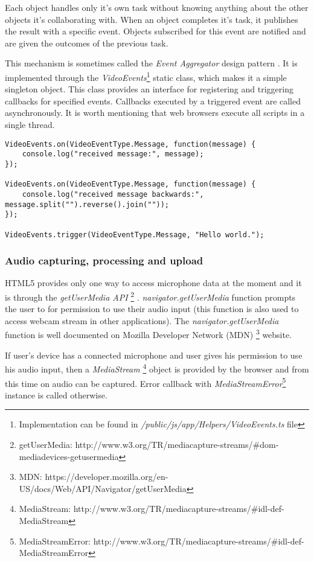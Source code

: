 Each object handles only it's own task without knowing anything about the other objects it's collaborating with. When an object completes it's task, it publishes the result with a specific event. Objects subscribed for this event are notified and are given the outcomes of the previous task.

This mechanism is sometimes called the \textit{Event Aggregator} design pattern \cite{}. It is implemented through the \textit{VideoEvents}\footnote{Implementation can be found in \textit{/public/js/app/Helpers/VideoEvents.ts} file} static class, which makes it a simple singleton object. This class provides an interface for registering and triggering callbacks for specified events. Callbacks executed by a triggered event are called asynchronously. It is worth mentioning that web browsers execute all scripts in a single thread.

\begin{verbatim}
VideoEvents.on(VideoEventType.Message, function(message) {
	console.log("received message:", message);
});

VideoEvents.on(VideoEventType.Message, function(message) {
	console.log("received message backwards:", message.split("").reverse().join(""));
});

VideoEvents.trigger(VideoEventType.Message, "Hello world.");
\end{verbatim}





\subsubsection{Audio capturing, processing and upload}

HTML5 provides only one way to access microphone data at the moment and it is through the \textit{getUserMedia API} \footnote{getUserMedia: http://www.w3.org/TR/mediacapture-streams/\#dom-mediadevices-getusermedia} \cite{}. \textit{navigator.getUserMedia} function prompts the user to for permission to use their audio input (this function is also used to access webcam stream in other applications). The \textit{navigator.getUserMedia} function is well documented on Mozilla Developer Network (MDN) \footnote{MDN: https://developer.mozilla.org/en-US/docs/Web/API/Navigator/getUserMedia} website.

If user's device has a connected microphone and user gives his permission to use his audio input, then a \textit{MediaStream} \footnote{MediaStream: http://www.w3.org/TR/mediacapture-streams/\#idl-def-MediaStream} object is provided by the browser and from this time on audio can be captured. Error callback with \textit{MediaStreamError}\footnote{MediaStreamError: http://www.w3.org/TR/mediacapture-streams/\#idl-def-MediaStreamError} instance is called otherwise.

